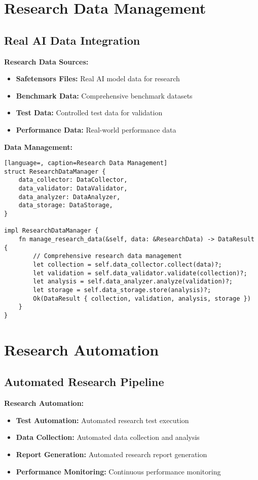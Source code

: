 \documentclass[12pt,a4paper]{article}
\begin{document}
\section{Research Data Management}

\subsection{Real AI Data Integration}

\textbf{Research Data Sources:}
\begin{itemize}
    \item \textbf{Safetensors Files:} Real AI model data for research
    \item \textbf{Benchmark Data:} Comprehensive benchmark datasets
    \item \textbf{Test Data:} Controlled test data for validation
    \item \textbf{Performance Data:} Real-world performance data
\end{itemize}

\textbf{Data Management:}
\begin{lstlisting}[language=, caption=Research Data Management]
struct ResearchDataManager {
    data_collector: DataCollector,
    data_validator: DataValidator,
    data_analyzer: DataAnalyzer,
    data_storage: DataStorage,
}

impl ResearchDataManager {
    fn manage_research_data(&self, data: &ResearchData) -> DataResult {
        // Comprehensive research data management
        let collection = self.data_collector.collect(data)?;
        let validation = self.data_validator.validate(collection)?;
        let analysis = self.data_analyzer.analyze(validation)?;
        let storage = self.data_storage.store(analysis)?;
        Ok(DataResult { collection, validation, analysis, storage })
    }
}
\end{lstlisting}

\section{Research Automation}

\subsection{Automated Research Pipeline}

\textbf{Research Automation:}
\begin{itemize}
    \item \textbf{Test Automation:} Automated research test execution
    \item \textbf{Data Collection:} Automated data collection and analysis
    \item \textbf{Report Generation:} Automated research report generation
    \item \textbf{Performance Monitoring:} Continuous performance monitoring
\end{itemize}
\end{document}
